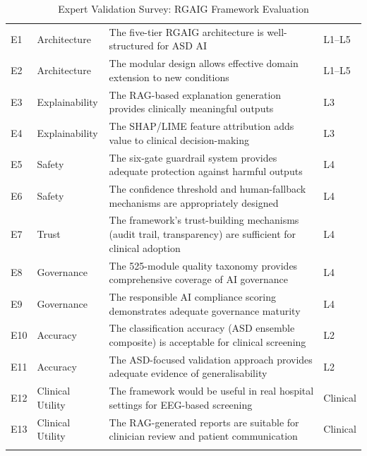 \begin{table}[p]
\tablestripes
\tablefontsize
\caption{Expert Validation Survey: RGAIG Framework Evaluation}
\begin{tabularx}{\textwidth}{@{} >{\raggedright\arraybackslash}p{0.5cm} >{\raggedright\arraybackslash}p{2.2cm} L >{\raggedright\arraybackslash}p{1.5cm} @{}}
\toprule
\thead{\#} &  &  &  \\
\midrule
E1 & Architecture & The five-tier RGAIG architecture is well-structured for ASD AI & L1--L5 \\
\addlinespace
E2 & Architecture & The modular design allows effective domain extension to new conditions & L1--L5 \\
\addlinespace
E3 & Explainability & The RAG-based explanation generation provides clinically meaningful outputs & L3 \\
\addlinespace
E4 & Explainability & The SHAP/LIME feature attribution adds value to clinical decision-making & L3 \\
\addlinespace
E5 & Safety & The six-gate guardrail system provides adequate protection against harmful outputs & L4 \\
\addlinespace
E6 & Safety & The confidence threshold and human-fallback mechanisms are appropriately designed & L4 \\
\addlinespace
E7 & Trust & The framework's trust-building mechanisms (audit trail, transparency) are sufficient for clinical adoption & L4 \\
\addlinespace
E8 & Governance & The 525-module quality taxonomy provides comprehensive coverage of AI governance & L4 \\
\addlinespace
E9 & Governance & The responsible AI compliance scoring demonstrates adequate governance maturity & L4 \\
\addlinespace
E10 & Accuracy & The classification accuracy (ASD ensemble composite) is acceptable for clinical screening & L2 \\
\addlinespace
E11 & Accuracy & The ASD-focused validation approach provides adequate evidence of generalisability & L2 \\
\addlinespace
E12 & Clinical Utility & The framework would be useful in real hospital settings for EEG-based screening & Clinical \\
\addlinespace
E13 & Clinical Utility & The RAG-generated reports are suitable for clinician review and patient communication & Clinical \\
\addlinespace

\end{tabularx}
\end{table}
